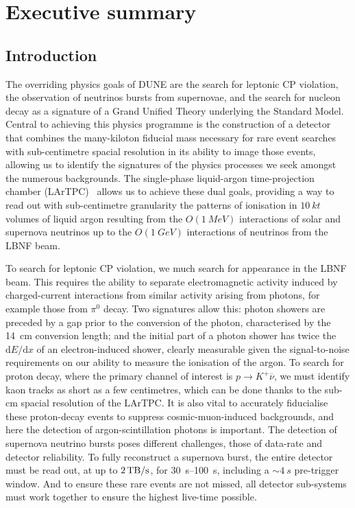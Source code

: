 \chapter{Executive summary}
\label{ch:fdsp-execsum}

\section{Introduction}
\label{sec:fdsp-exec-introduction}


The overriding physics goals of DUNE are the search for leptonic CP violation, the observation of neutrinos bursts from supernovae, and the search for nucleon decay as a signature of a Grand Unified Theory underlying the Standard Model. Central to achieving this physics programme is the construction of a detector that combines the many-kiloton fiducial mass necessary for rare event searches with sub-centimetre spacial resolution in its ability to image those events, allowing us to identify the signatures of the physics processes we seek amongst the numerous backgrounds. The single-phase liquid-argon time-projection chamber (LArTPC)~\cite{ref:Rubbia:1977zz} allows us to achieve these dual goals, providing a way to read out with sub-centimetre granularity the patterns of ionisation in $\SI{10}{kt}$ volumes of liquid argon resulting from the $O(\SI{1}{MeV})$ interactions of solar and supernova neutrinos up to the $O(\SI{1}{GeV})$ interactions of neutrinos from the LBNF beam.

To search for leptonic CP violation, we much search for \nue appearance in the LBNF \numu beam. This requires the ability to separate electromagnetic activity induced by charged-current \nue interactions from similar activity arising from photons, for example those from $\pi^{0}$ decay. Two signatures allow this: photon showers are preceded by a gap prior to the conversion of the photon, characterised by the \SI{14}{cm} conversion length; and the initial part of a photon shower has twice the $\mathrm{d}E/\mathrm{d}x$ of an electron-induced shower, clearly measurable given the signal-to-noise requirements on our ability to measure the ionisation of the argon. To search for proton decay, where the primary channel of interest is $p\rightarrow K^{+}\overline{\nu}$, we must identify kaon tracks as short as a few centimetres, which can be done thanks to the sub-\si{cm} spacial resolution of the LArTPC. It is also vital to accurately fiducialise these proton-decay events to suppress cosmic-muon-induced backgrounds, and here the detection of argon-scintillation photons is important. The detection of supernova neutrino bursts poses different challenges, those of data-rate and detector reliability. To fully reconstruct a supernova burst, the entire detector must be read out, at up to $\SI{2}{\tera\byte/\second}$, for \SIrange{30}{100}{s}, including a $\sim\!\SI{4}{s}$ pre-trigger window. And to ensure these rare events are not missed, all detector sub-systems must work together to ensure the highest live-time possible.

